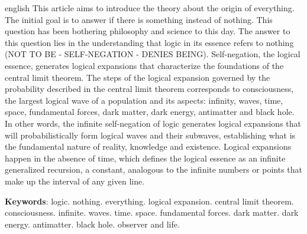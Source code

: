 \vspace{-5mm}
\renewcommand{\resumoname}{Abstract}
\begin{resumoumacoluna}
 \begin{otherlanguage*}{english}
	\vspace{-2mm}
	This article aims to introduce the theory about the origin of everything. The initial goal is to answer if there is something instead of nothing. This question has been bothering philosophy and science to this day. The answer to this question lies in the understanding that logic in its essence refers to nothing (NOT TO BE - SELF-NEGATION - DENIES BEING). Self-negation, the logical essence, generates logical expansions that characterize the foundations of the central limit theorem. The steps of the logical expansion governed by the probability described in the central limit theorem corresponds to consciousness, the largest logical wave of a population and its aspects: infinity, waves, time, space, fundamental forces, dark matter, dark energy, antimatter and black hole. In other words, the infinite self-negation of logic generates logical expansions that will probabilistically form logical waves and their subwaves, establishing what is the fundamental nature of reality, knowledge and existence. Logical expansions happen in the absence of time, which defines the logical essence as an infinite generalized recursion, a constant, analogous to the infinite numbers or points that make up the interval of any given line.
	
	\noindent
	\textbf{Keywords}: logic. nothing. everything. logical expansion. central limit theorem. consciousness. infinite. waves. time. space. fundamental forces. dark matter. dark energy. antimatter. black hole. observer and life.
 \end{otherlanguage*}  
\end{resumoumacoluna}
